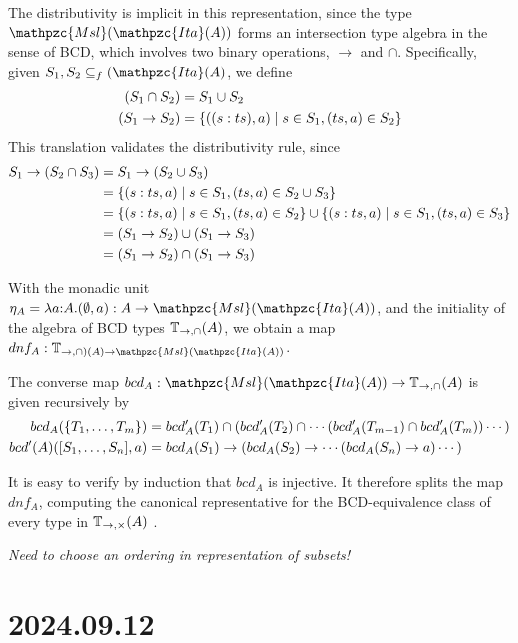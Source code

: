 \documentclass{scrartcl}
\newcommand{\ita}{\mathpzc{Ita}}
\newcommand{\msl}{\mathpzc{Msl}}
\begin{document}
The distributivity is implicit in this representation, since the
type $\msl(\ita(A))$ forms an intersection type algebra in the sense of
BCD, which involves two binary operations, $\to$ and $\cap$.
Specifically, given $S_1,S_2 \sse_f (\ita(A)$, we
define
\begin{align*}
  (S_1 \cap S_2) &= S_1 \cup S_2 \\
  (S_1 \to S_2) &= \left\{((s:ts),a) \mid s \in S_1, (ts,a) \in S_2\right\}
\end{align*}
This translation validates the distributivity rule, since
\begin{align*}
  S_1 \to (S_2 \cap S_3)
  &= S_1 \to (S_2 \cup S_3) \\
  &= \left\{(s:ts,a) \mid s \in S_1, (ts,a) \in S_2 \cup S_3\right\}\\
  &= \left\{(s:ts,a) \mid s \in S_1, (ts,a) \in S_2\right\}
  \cup \left\{(s:ts,a) \mid s \in S_1, (ts,a) \in S_3\right\}\\
  &= (S_1 \to S_2) \cup (S_1 \to S_3) \\
  &= (S_1 \to S_2) \cap (S_1 \to S_3)
\end{align*}

With the monadic unit $\eta_A = \lam a{:}A. (\emptyset,a): A \to \msl(\ita(A))$,
and the initiality of the algebra of BCD types $\mathbb{T}_{\to,\cap}(A)$,
we obtain a map $dnf_A : \types_{\to,\cap)(A) \to \msl(\ita(A))}$.

The converse map $bcd_A : \msl(\ita(A)) \to \types_{\to,\cap}(A)$
is given recursively by
\begin{align*}
  bcd_A(\left\{T_1,\dots,T_m\right\}) &= bcd'_A(T_1) \cap (bcd'_A(T_2) \cap
    \cdots (bcd'_A(T_{m-1}) \cap bcd'_A(T_m)) \cdots)\\
  bcd'(A)([S_1,\dots,S_n],a) &= bcd_A(S_1) \to (bcd_A(S_2) \to \cdots (bcd_A(S_n)\to a)
  \cdots)
\end{align*}

It is easy to verify by induction that $bcd_A$ is injective.
It therefore splits the map $dnf_A$, computing the canonical representative
for the BCD-equivalence class of every type in $\mathbb{T}_{\to,\times}(A)$ .

\emph{Need to choose an ordering in representation of subsets!}

\section{2024.09.12}
\end{document}

